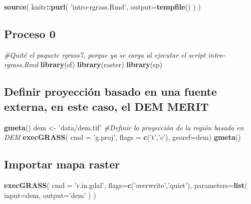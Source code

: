 \documentclass[11pt,]{article}
\newenvironment{Shaded}{\begin{snugshade}}{\end{snugshade}}
\newcommand{\KeywordTok}[1]{\textcolor[rgb]{0.13,0.29,0.53}{\textbf{#1}}}
\newcommand{\DataTypeTok}[1]{\textcolor[rgb]{0.13,0.29,0.53}{#1}}
\newcommand{\StringTok}[1]{\textcolor[rgb]{0.31,0.60,0.02}{#1}}
\newcommand{\CommentTok}[1]{\textcolor[rgb]{0.56,0.35,0.01}{\textit{#1}}}
\newcommand{\OperatorTok}[1]{\textcolor[rgb]{0.81,0.36,0.00}{\textbf{#1}}}
\newcommand{\NormalTok}[1]{#1}
\begin{document}
\begin{Shaded}
\begin{Highlighting}[]
\KeywordTok{source}\NormalTok{(}
\NormalTok{  knitr}\OperatorTok{::}\KeywordTok{purl}\NormalTok{(}
    \StringTok{'intro-rgrass.Rmd'}\NormalTok{,}
    \DataTypeTok{output=}\KeywordTok{tempfile}\NormalTok{()}
\NormalTok{  )}
\NormalTok{)}
\end{Highlighting}
\end{Shaded}

\subsection{Proceso 0}\label{proceso-0}

\begin{Shaded}
\begin{Highlighting}[]
\CommentTok{#Quité el paquete rgrass7, porque ya se carga al ejecutar el script intro-rgrass.Rmd}
\KeywordTok{library}\NormalTok{(sf)}
\KeywordTok{library}\NormalTok{(raster)}
\KeywordTok{library}\NormalTok{(sp)}
\end{Highlighting}
\end{Shaded}

\subsection{Definir proyección basado en una fuente externa, en este
caso, el DEM
MERIT}\label{definir-proyecciuxf3n-basado-en-una-fuente-externa-en-este-caso-el-dem-merit}

\begin{Shaded}
\begin{Highlighting}[]
\KeywordTok{gmeta}\NormalTok{()}
\NormalTok{dem <-}\StringTok{ 'data/dem.tif'}
\CommentTok{#Definir la proyección de la región basada en DEM}
\KeywordTok{execGRASS}\NormalTok{(}
  \DataTypeTok{cmd =} \StringTok{'g.proj'}\NormalTok{,}
  \DataTypeTok{flags =} \KeywordTok{c}\NormalTok{(}\StringTok{'t'}\NormalTok{,}\StringTok{'c'}\NormalTok{),}
  \DataTypeTok{georef=}\NormalTok{dem)}
\KeywordTok{gmeta}\NormalTok{()}
\end{Highlighting}
\end{Shaded}

\subsection{Importar mapa raster}\label{importar-mapa-raster}

\begin{Shaded}
\begin{Highlighting}[]
\KeywordTok{execGRASS}\NormalTok{(}
  \DataTypeTok{cmd =} \StringTok{'r.in.gdal'}\NormalTok{,}
  \DataTypeTok{flags=}\KeywordTok{c}\NormalTok{(}\StringTok{'overwrite'}\NormalTok{,}\StringTok{'quiet'}\NormalTok{),}
  \DataTypeTok{parameters=}\KeywordTok{list}\NormalTok{(}
    \DataTypeTok{input=}\NormalTok{dem,}
    \DataTypeTok{output=}\StringTok{'dem'}
\NormalTok{  )}
\NormalTok{)}
\end{Highlighting}
\end{Shaded}
\end{document}
